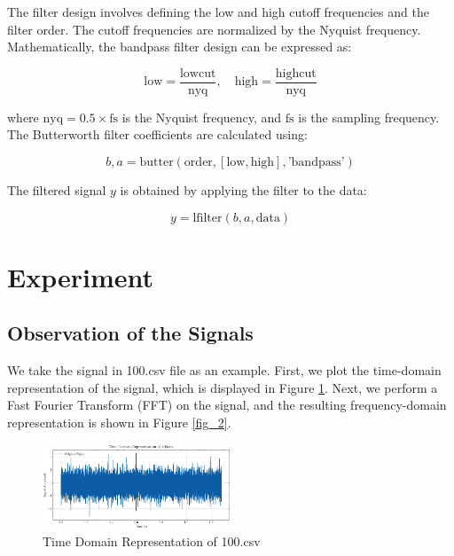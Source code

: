 \documentclass[conference]{IEEEtran}
\begin{document}
The filter design involves defining the low and high cutoff frequencies and the filter order. The cutoff frequencies are normalized by the Nyquist frequency. Mathematically, the bandpass filter design can be expressed as:

\begin{equation}
\text{low} = \frac{\text{lowcut}}{\text{nyq}}, \quad \text{high} = \frac{\text{highcut}}{\text{nyq}}
\end{equation}

where \(\text{nyq} = 0.5 \times \text{fs}\) is the Nyquist frequency, and \(\text{fs}\) is the sampling frequency. The Butterworth filter coefficients are calculated using:

\begin{equation}
b, a = \text{butter}(\text{order}, [\text{low}, \text{high}], \text{'bandpass'})
\end{equation}

The filtered signal \( y \) is obtained by applying the filter to the data:

\begin{equation}
y = \text{lfilter}(b, a, \text{data})
\end{equation}

\section{Experiment}

\subsection{Observation of the Signals}

We take the signal in 100.csv file as an example. First, we plot the time-domain representation of the signal, which is displayed in Figure \ref{fig_1}. Next, we perform a Fast Fourier Transform (FFT) on the signal, and the resulting frequency-domain representation is shown in Figure \ref{fig_2}.

\begin{figure}[htbp]
    \centerline{\includegraphics[width=0.5\textwidth]{figure/fig_1.png}}
    \caption{Time Domain Representation of 100.csv}
    \label{fig_1}
\end{figure}
\end{document}
